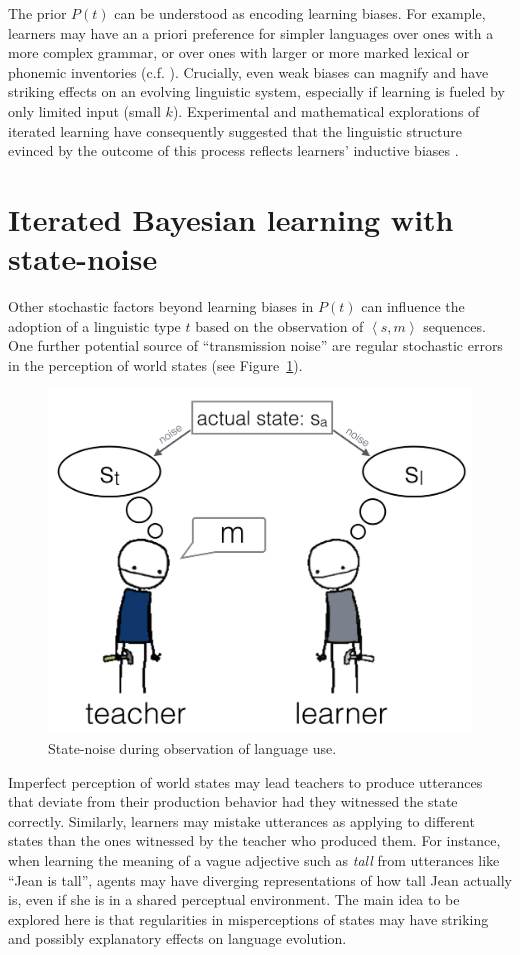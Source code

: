 \documentclass[10pt,a4paper]{article}
\newcommand{\tuple}[1]{\ensuremath{\left\langle #1 \right\rangle}}
\begin{document}
The prior $P(t)$ can be understood as encoding learning biases. For example, learners may have
an a priori preference for simpler languages over ones with a more complex grammar, or over
ones with larger or more marked lexical or phonemic inventories
(c.f. \citealt{feldman:2000,chater+vitanyi:2003, kirby+etal:2015}). Crucially, even weak biases
can magnify and have striking effects on an evolving linguistic system, especially if learning
is fueled by only limited input (small $k$). Experimental and mathematical explorations of
iterated learning have consequently suggested that the linguistic structure evinced by the outcome of this process
reflects learners' inductive biases \citep{kirby+etal:2007,kirby+etal:2014}.


\section{Iterated Bayesian learning with state-noise}

Other stochastic factors beyond learning biases in $P(t)$ can influence the adoption of a
linguistic type $t$ based on the observation of $\tuple{s,m}$ sequences. One further potential source
of ``transmission noise'' are regular stochastic errors in the perception of world states (see
Figure~\ref{fig:cartoon}).
%
\begin{figure}[t]
  \centering
  \includegraphics[width = 0.75\linewidth]{pics/cartoon_picture.png}
  \caption{State-noise during observation of language use.}
  \label{fig:cartoon}
\end{figure}
% 
Imperfect perception of world states may lead teachers to produce utterances that deviate from
their production behavior had they witnessed the state correctly. Similarly, learners may
mistake utterances as applying to different states than the ones witnessed by the teacher who
produced them. For instance, when learning the meaning of a vague adjective such as {\em tall}
from utterances like ``Jean is tall'', agents may have diverging representations of how tall
Jean actually is, even if she is in a shared perceptual environment. The main idea to be
explored here is that regularities in misperceptions of states may have striking and possibly
explanatory effects on language evolution.
\end{document}
